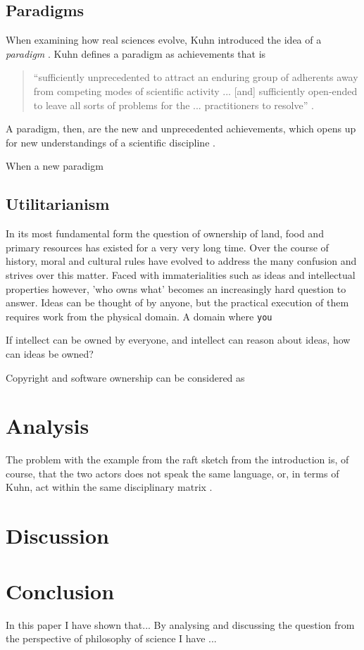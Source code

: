 \documentclass{article}
\begin{document}
\subsection{Paradigms} \label{Theory:Paradigms}
When examining how real sciences evolve, Kuhn introduced the idea of a \textit{paradigm} \citep[p. 59]{Holm:2014}. Kuhn defines a paradigm as achievements that is
\begin{quote}
``sufficiently unprecedented to attract an enduring group of adherents away from competing modes of scientific activity ... [and] sufficiently open-ended to leave all sorts of problems for the ... practitioners to resolve'' \citep[p. 10-11]{Kuhn:2012}.
\end{quote}
A paradigm, then, are the new and unprecedented achievements, which opens up for new understandings of a scientific discipline \citep[p. 61]{Holm:2014}.

When a new paradigm



\subsection{Utilitarianism}
In its most fundamental form the question of ownership of land, food and primary resources has existed for a
very very long time. Over the course of history, moral and cultural rules have evolved to address the
many confusion and strives over this matter. Faced with immaterialities such as
ideas and intellectual properties however, 'who owns what' becomes an increasingly hard question to answer. Ideas can be thought of by anyone, but the practical execution of them requires work from the physical domain. A domain where \texttt{you}

If intellect can be owned by everyone, and intellect can reason about ideas, how can ideas be owned? 

Copyright and software ownership can be considered as 

\section{Analysis}
The problem with the example from the raft sketch from the introduction is, of course, that the two actors does not speak the same language, or, in terms of Kuhn, act within the same disciplinary matrix \citep{Holm:2014}.

\section{Discussion}

\section{Conclusion}
In this paper I have shown that...
By analysing and discussing the question from the perspective
of philosophy of science I have ...


\end{document}
